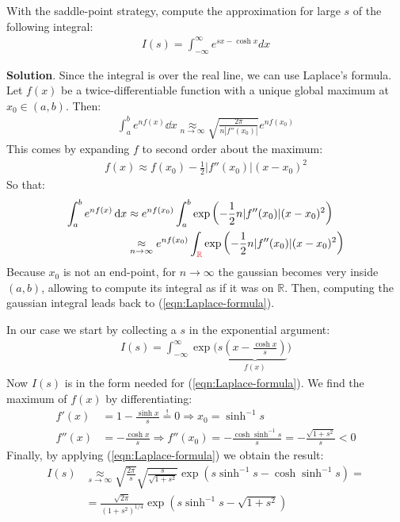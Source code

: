 \documentclass[../template.tex]{subfiles}
\begin{document}
\begin{exo} 
    With the saddle-point strategy, compute the approximation for large $s$ of the following integral:
    \begin{align} \label{eqn:I1}
        I(s) = \int_{-\infty}^{\infty} e^{sx - \cosh x} dx
    \end{align} 

    \medskip

    \textbf{Solution}. Since the integral is over the real line, we can use Laplace's formula. Let $f(x)$ be a twice-differentiable function with a unique global maximum at $x_0 \in (a,b)$. Then:
    \begin{align} \label{eqn:Laplace-formula}
        \int_a^b e^{n f(x)} \dd{x} \underset{n \to \infty}{\approx} \sqrt{\frac{2\pi}{n |f''(x_0)|} } e^{n f(x_0)}
    \end{align}
    This comes by expanding $f$ to second order about the maximum:
    \begin{align*}
        f(x) \approx f(x_0) - \frac{1}{2}|f''(x_0)|(x-x_0)^2 
    \end{align*}
    So that:
    \begin{align*}
        \int_a^b e^{n f(x)} \dd{x} &\approx e^{n f(x_0)} \int_a^b \exp\left(-\frac{1}{2} n |f''(x_0)| (x-x_0)^2 \right)\\ &\underset{n \to \infty}{\approx}  e^{n f(x_0)} \int_{\textcolor{Red}{\mathbb{R}}} \exp\left(-\frac{1}{2} n |f''(x_0)| (x-x_0)^2 \right)
    \end{align*}
    Because $x_0$ is not an end-point, for $n \to \infty$ the gaussian becomes very  inside $(a,b)$, allowing to compute its integral as if it was on $\mathbb{R}$. Then, computing the gaussian integral leads back to (\ref{eqn:Laplace-formula}).

    \medskip

    In our case we start by collecting a $s$ in the exponential argument:
    \begin{align*}
        I(s) = \int_{-\infty}^{\infty} \exp\Bigg(s\underbrace{\left(x-\frac{\cosh x}{s} \right)}_{f(x)}\Bigg)
    \end{align*}
    Now $I(s)$ is in the form needed for (\ref{eqn:Laplace-formula}).
    We find the maximum of $f(x)$ by differentiating:
    \begin{align*}
        f'(x) &=1- \frac{\sinh x}{s}  \overset{!}{=} 0 \Rightarrow x_0 = \sinh^{-1} s\\
        f''(x) &=-  \frac{\cosh x}{s} \Rightarrow f''(x_0) =- \frac{\cosh \sinh^{-1} s}{s} =- \frac{\sqrt{1+s^2}}{s} < 0 
    \end{align*}   
    Finally, by applying (\ref{eqn:Laplace-formula}) we obtain the result:
    \begin{align*}
        I(s) &\underset{s \to \infty}{\approx} \sqrt{\frac{2 \pi}{s} } \sqrt{\frac{s}{\sqrt{1+s^2}} } \exp\left(s \sinh^{-1} s-\cosh\sinh^{-1}s\right) =\\
        &= \frac{\sqrt{2\pi}}{(1+s^2)^{1/4}} \exp\left(s \sinh^{-1}s-\sqrt{1+s^2} \right) 
    \end{align*}
    
        \end{exo}
\end{document}
